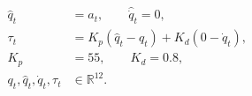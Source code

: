 \documentclass[border=7pt]{standalone}
\begin{document}
\color{ink}
$\displaystyle \begin{aligned}
\hat q_t&=a_t,\qquad\hat{\dot q}_t=0,\\[3pt]
\tau_t&=K_p(\hat q_t-q_t)+K_d(0-\dot q_t),\\[3pt]
K_p&=55,\qquad K_d=0.8,\\[3pt]
q_t,\hat q_t,\dot q_t,\tau_t&\in\mathbb R^{12}.
\end{aligned}$
\end{document}

